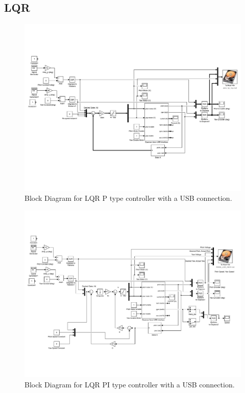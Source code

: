 \subsection{LQR}
\begin{figure}[!htbp]
    \centering
    \includegraphics[width=.8\textwidth,keepaspectratio=true]{figs/img/LQR_USB}
    \caption{Block Diagram for LQR P type controller with a USB connection.}
    \label{fig:LQR_P_USB_Block_Diagram}
\end{figure}
\begin{figure}[!htbp]
    \centering
    \includegraphics[width=.8\textwidth,keepaspectratio=true]{figs/img/LQR_PI_USB}
    \caption{Block Diagram for LQR PI type controller with a USB connection.}
    \label{fig:LQR_PI_USB_Block_Diagram}
\end{figure}
